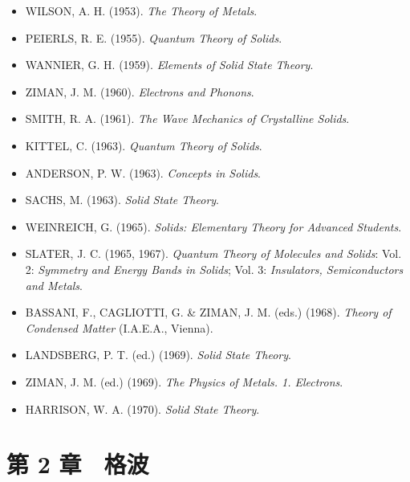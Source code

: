 \begin{itemize}[leftmargin=2em, itemsep=0.2em]
\item WILSON, A. H. (1953). \emph{The Theory of Metals}.
\item PEIERLS, R. E. (1955). \emph{Quantum Theory of Solids}.
\item WANNIER, G. H. (1959). \emph{Elements of Solid State Theory}.
\item ZIMAN, J. M. (1960). \emph{Electrons and Phonons}.
\item SMITH, R. A. (1961). \emph{The Wave Mechanics of Crystalline Solids}.
\item KITTEL, C. (1963). \emph{Quantum Theory of Solids}.
\item ANDERSON, P. W. (1963). \emph{Concepts in Solids}.
\item SACHS, M. (1963). \emph{Solid State Theory}.
\item WEINREICH, G. (1965). \emph{Solids: Elementary Theory for Advanced Students}.
\item SLATER, J. C. (1965, 1967). \emph{Quantum Theory of Molecules and Solids}: Vol. 2: \emph{Symmetry and Energy Bands in Solids}; Vol. 3: \emph{Insulators, Semiconductors and Metals}.
\item BASSANI, F., CAGLIOTTI, G. \& ZIMAN, J. M. (eds.) (1968). \emph{Theory of Condensed Matter} (I.A.E.A., Vienna).
\item LANDSBERG, P. T. (ed.) (1969). \emph{Solid State Theory}.
\item ZIMAN, J. M. (ed.) (1969). \emph{The Physics of Metals. 1. Electrons}.
\item HARRISON, W. A. (1970). \emph{Solid State Theory}.
\end{itemize}

\section*{第 2 章　格波}

